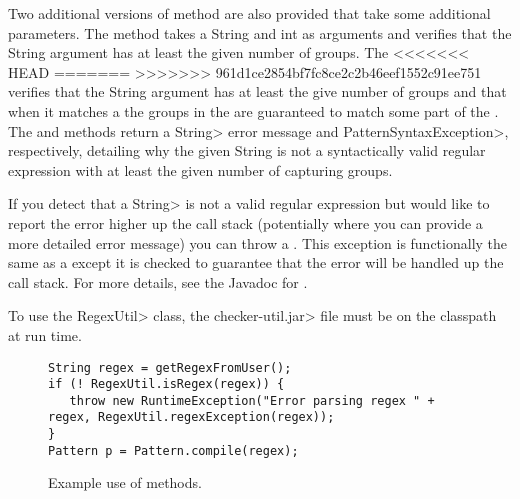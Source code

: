 Two additional versions of  method are also provided that take some additional
parameters. The 
method takes a String and int as arguments and
verifies that the String argument has at least the given number of groups. The
<<<<<<< HEAD
=======
>>>>>>> 961d1ce2854bf7fc8ce2c2b46eef1552c91ee751
verifies that the String argument has at least the give number of groups and that when it
matches a  the groups in the  are guaranteed to match some
part of the . The
 and
methods return a \<String> error message and \<Pattern\-Syntax\-Exception>,
respectively, detailing why the given String is not a syntactically valid
regular expression with at least the given number of capturing groups.

\begin{sloppypar}
If you detect that a \<String> is not a valid regular expression but would like
to report the error higher up the call stack (potentially where you can
provide a more detailed error message) you can throw a
. This exception is
functionally the same as a
except it is checked to guarantee that the error will be handled up the
call stack.  For more details, see the Javadoc for
.
\end{sloppypar}

To use the \<RegexUtil> class, the \<checker-util.jar> file
must be on the classpath at run time.

\begin{figure}
\begin{smaller}
\begin{Verbatim}
String regex = getRegexFromUser();
if (! RegexUtil.isRegex(regex)) {
   throw new RuntimeException("Error parsing regex " + regex, RegexUtil.regexException(regex));
}
Pattern p = Pattern.compile(regex);
\end{Verbatim}
\end{smaller}
\caption{Example use of  methods.}
\label{fig-regex-util-example}
\end{figure}

